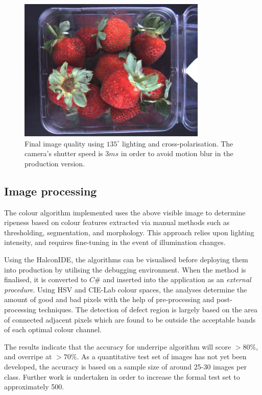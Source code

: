 \documentclass[fleqn,twoside,12pt]{report}
\begin{document}
\begin{figure}[h!]
	\centering
	\includegraphics[width=0.8\textwidth]{final_image.jpg}
	\caption{Final image quality using $135^{\circ}$ lighting and cross-polarisation. The camera's shutter speed is $3ms$ in order to avoid motion blur in the production version.}
	\label{fig:final_image}
\end{figure} 



\subsection{Image processing}


The colour algorithm implemented uses the above visible image to determine ripeness based on colour features extracted via manual methods such as thresholding, segmentation, and morphology. This approach relies upon lighting intensity, and requires fine-tuning in the event of illumination changes. 

Using the Halcon\texttrademark IDE, the algorithms can be visualised before deploying them into production by utilising the debugging environment. When the method is finalised, it is converted to $C\#$ and inserted into the application as an \textit{external procedure}. Using HSV and CIE-Lab colour spaces, the analyses determine the amount of good and bad pixels with the help of pre-processing and post-processing techniques. The detection of defect region is largely based on the area of connected adjacent pixels which are found to be outside the acceptable bands of each optimal colour channel.   

The results indicate that the accuracy for underripe algorithm will score $>80\%$, and overripe at $>70\%$. As a quantitative test set of images has not yet been developed, the accuracy is based on a sample size of around 25-30 images per class. Further work is undertaken in order to increase the formal test set to approximately 500.   
\end{document}
